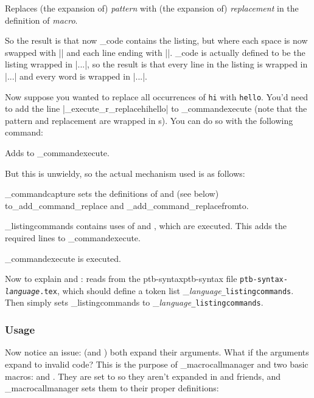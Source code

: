 Replaces (the expansion of) {\it pattern} with (the expansion of) {\it replacement} in the definition of {\it macro}.
\emacroexp

So the result is that now \macro\_code{} contains the listing, but where each space is now swapped with \inlinecode|\w \w| and each line ending with \inlinecode|\w\n\n\w|.
\macro\_code{} is actually defined to be the listing wrapped in \inlinecode|\n\w...\w\n|, so the result is that every line in the listing is wrapped in \inlinecode|\n...\n| and every word is wrapped in \inlinecode|\w...\w|.

Now suppose you wanted to replace all occurrences of {\tt hi} with {\tt hello}.
You'd need to add the line \inlinecode|\_execute{\_r_replace{\w hi\w}{\w hello\w}}| to \macro\_commandexecute{} (note that the pattern and replacement are wrapped in \macro\w s).
You can do so with the following command:

Adds  to \macro\_commandexecute.
\emacroexp

But this is unwieldy, so the actual mechanism used is as follows:
\benum
    \item \macro\_commandcapture{} sets the definitions of \macro\replace{} and \gotomacro\replacefromto{} (see below) to\hfill\break\macro\_add_command_replace{} and \macro\_add_command_replacefromto{}.
    \item \macro\_listingcommands{} contains uses of \macro\replace{} and \macro\replacefromto{}, which are executed.
        This adds the required lines to \macro\_commandexecute.
    \item \macro\_commandexecute{} is executed.
\eenum

Now to explain \gotomacro\loadsyntax{} and \gotomacro\setsyntax:  reads from the ptb-syntaxptb-syntax  file {\tt ptb-syntax-{\it language}.tex}, which should define a token list
\macro\_{\it language}{\tt _listingcommands}.
Then \macro\setsyntax{} simply sets \macro\_listingcommands{} to \macro\_{\it language}{\tt _listingcommands}.

\subsubsection{Usage}

Now notice an issue: \macro\replace{} (and \macro\replacefromto) both expand their arguments.
What if the arguments expand to invalid code?
This is the purpose of \macro\_macrocallmanager{} and two basic macros: \macro\call{} and \macro\mlcall.
They are set to \macro\relax{} so they aren't expanded in \macro\replace{} and friends, and \macro\_macrocallmanager{} sets them to their proper definitions:

